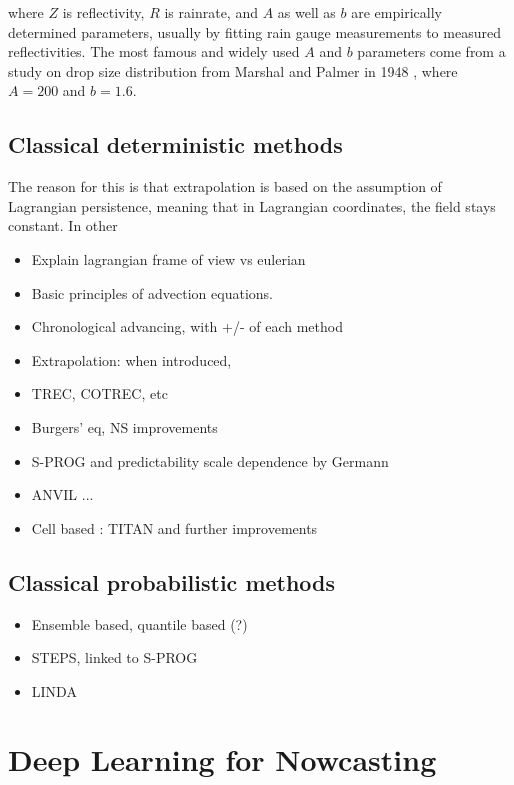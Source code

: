 where $Z$ is reflectivity, $R$ is rainrate, and $A$ as well as $b$ are empirically determined parameters, usually by fitting rain gauge measurements to measured reflectivities. The most famous and widely used $A$ and $b$ parameters come from a study on drop size distribution from Marshal and Palmer in 1948 \cite{marshall1948size}, where $A=200$ and $b=1.6$.






\subsection{Classical deterministic methods}
\label{section:classic_nowcast}

The reason for this is that extrapolation is based on the assumption of Lagrangian persistence, meaning that in Lagrangian coordinates, the field stays constant. In other 

\begin{itemize}
	\item Explain lagrangian frame of view vs eulerian
	\item Basic principles of advection equations. 
	\item Chronological advancing, with +/- of each method
	\item Extrapolation: when introduced,
	\item TREC, COTREC, etc
	\item Burgers' eq, NS improvements 
	\item S-PROG and predictability scale dependence by Germann
	\item ANVIL ...
	\item Cell based : TITAN and further improvements
\end{itemize}

\subsection{Classical probabilistic methods}
\begin{itemize}
	\item Ensemble based, quantile based (?)
	\item STEPS, linked to S-PROG
	\item LINDA 
\end{itemize}



\section{Deep Learning for Nowcasting}

